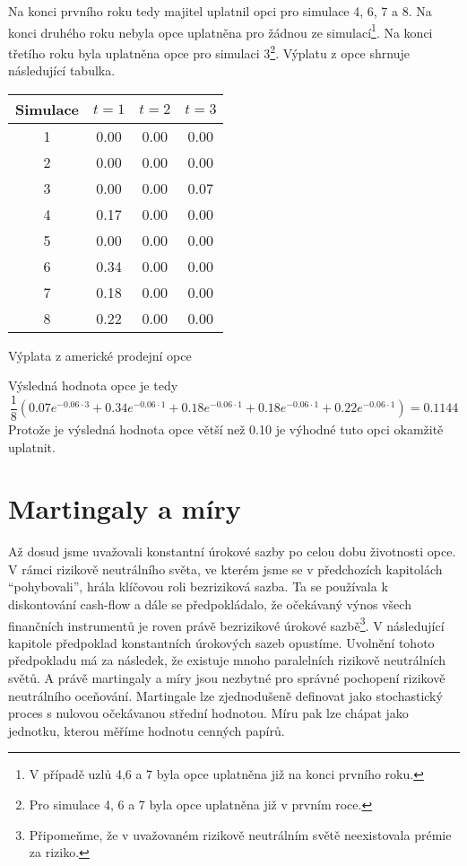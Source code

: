 \documentclass[a4paper]{book}
\begin{document}
Na konci prvního roku tedy majitel uplatnil opci pro simulace 4, 6, 7 a 8. Na konci druhého roku nebyla opce uplatněna pro žádnou ze simulací\footnote{V případě uzlů 4,6 a 7 byla opce uplatněna již na konci prvního roku.}. Na konci třetího roku byla uplatněna opce pro simulaci 3\footnote{Pro simulace 4, 6 a 7 byla opce uplatněna již v prvním roce.}. Výplatu z opce shrnuje následující tabulka.
\begin{center}
\begin{tabular}{c c c c }
\hline
\textbf{Simulace} & $t=1$ & $t=2$ & $t=3$ \\
\hline
1 & 0.00 & 0.00 & 0.00 \\
2 & 0.00 & 0.00 & 0.00 \\
3 & 0.00 & 0.00 & 0.07 \\
4 & 0.17 & 0.00 & 0.00 \\
5 & 0.00 & 0.00 & 0.00 \\
6 & 0.34 & 0.00 & 0.00 \\
7 & 0.18 & 0.00 & 0.00 \\
8 & 0.22 & 0.00 & 0.00 \\
\hline
\end{tabular}
\end{center}
\begin{center}
\small{Výplata z americké prodejní opce}
\end{center}
Výsledná hodnota opce je tedy
\begin{equation*}
\frac{1}{8}(0.07e^{-0.06 \cdot 3} + 0.34e^{-0.06 \cdot 1} + 0.18e^{-0.06 \cdot 1} + 0.18e^{-0.06 \cdot 1} + 0.22e^{-0.06 \cdot 1})=0.1144
\end{equation*}
Protože je výsledná hodnota opce větší než 0.10 je výhodné tuto opci okamžitě uplatnit.

\chapter{Martingaly a míry}

Až dosud jsme uvažovali konstantní úrokové sazby po celou dobu životnosti opce. V rámci rizikově neutrálního světa, ve kterém jsme se v předchozích kapitolách ``pohybovali'', hrála klíčovou roli bezriziková sazba. Ta se používala k diskontování cash-flow a dále se předpokládalo, že očekávaný výnos všech finančních instrumentů je roven právě bezrizikové úrokové sazbě\footnote{Připomeňme, že v uvažovaném rizikově neutrálním světě neexistovala prémie za riziko.}. V následující kapitole předpoklad konstantních úrokových sazeb opustíme. Uvolnění tohoto předpokladu má za následek, že existuje mnoho paralelních rizikově neutrálních světů. A právě martingaly a míry jsou nezbytné pro správné pochopení rizikově neutrálního oceňování. Martingale lze zjednodušeně definovat jako stochastický proces s nulovou očekávanou střední hodnotou. Míru pak lze chápat jako jednotku, kterou měříme hodnotu cenných papírů.
\end{document}
